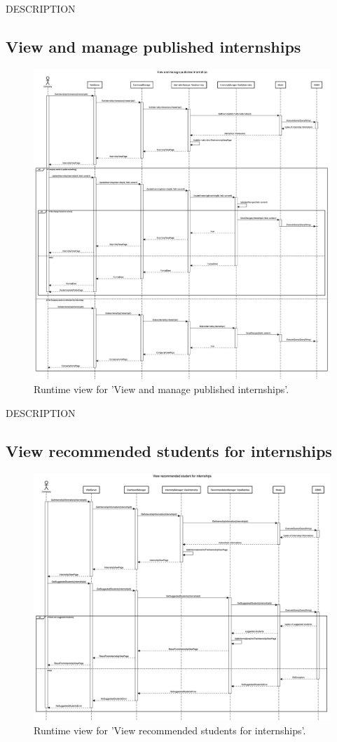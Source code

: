 DESCRIPTION


\subsection{View and manage published internships}
\begin{figure}[H]
    \begin{center}
        \includegraphics[width=0.8\linewidth]{DD/LaTeX/Images/RuntimeView/ManageInternships.png}
        \caption{Runtime view for 'View and manage published internships'.}
        \label{fig:runtime_ManageInternships}%
    \end{center}
\end{figure}

DESCRIPTION


\subsection{View recommended students for internships}
\begin{figure}[H]
    \begin{center}
        \includegraphics[width=0.8\linewidth]{DD/LaTeX/Images/RuntimeView/ViewRecommendedStudenst.png}
        \caption{Runtime view for 'View recommended students for internships'.}
        \label{fig:runtime_ViewRecommendedStudenst}%
    \end{center}
\end{figure}

